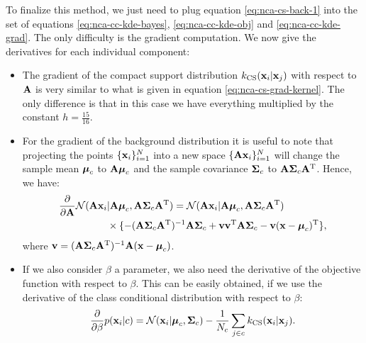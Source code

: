 	To finalize this method, we just need to plug equation \eqref{eq:nca-cs-back-1} into
	the set of equations \eqref{eq:nca-cc-kde-bayes}, \eqref{eq:nca-cc-kde-obj} and
	\eqref{eq:nca-cc-kde-grad}. The only difficulty is the gradient computation. We now give the derivatives for each individual component:
	\begin{itemize}
		\item The gradient of the compact support distribution $k_\text{CS}(\mathbf{x}_i|\mathbf{x}_j)$ with respect to $\mathbf{A}$ is very similar to what is given in equation \eqref{eq:nca-cs-grad-kernel}. The only difference is that in this case we have everything multiplied by the constant $h=\frac{15}{16}$.
		\item For the gradient of the background distribution it is useful to note that projecting the points $\{\mathbf{x}_i\}_{i=1}^N$
	into a new space $\{\mathbf{A}\mathbf{x}_i\}_{i=1}^N$ will change the sample mean $\mbox{\boldmath $\mu$}_c$ to
	$\mathbf{A}\mbox{\boldmath $\mu$}_c$ and the sample covariance $\mbox{\boldmath $\Sigma$}_c$ to
	$\mathbf{A}\mbox{\boldmath $\Sigma$}_c\mathbf{A}^\mathrm{T}$. Hence, we have:
		\begin{align}
			\frac{\partial}{\partial \mathbf{A}} \mathcal{N}(\mathbf{A}\mathbf{x}_i&|\mathbf{A}\mbox{\boldmath $\mu$}_c, \mathbf{A}\mbox{\boldmath $\Sigma$}_c
	\mathbf{A}^\mathrm{T}) = \mathcal{N}(\mathbf{A}\mathbf{x}_i|\mathbf{A}\mbox{\boldmath $\mu$}_c, \mathbf{A}\mbox{\boldmath $\Sigma$}_c
	\mathbf{A}^\mathrm{T})\notag\\
			&\times \{ -(\mathbf{A}\mbox{\boldmath $\Sigma$}_c \mathbf{A}^\mathrm{T})^{-1}\mathbf{A}\mbox{\boldmath $\Sigma$}_c
			+\mathbf{v} \mathbf{v} ^ \mathrm{T} \mathbf{A} \mbox{\boldmath $\Sigma$}_c - \mathbf{v} (\mathbf{x} - \mbox{\boldmath $\mu$}_c)^\mathrm{T}
			\},
		\end{align}
		where $\mathbf{v} = (\mathbf{A}\mbox{\boldmath $\Sigma$}_c \mathbf{A}^\mathrm{T})^{-1}\mathbf{A}(\mathbf{x} - \mbox{\boldmath $\mu$}_c)$.
		\item If we also consider $\beta$ a parameter, we also need the derivative of the objective function with respect to $\beta$. This can be easily obtained, if we use the derivative of the class conditional distribution with respect to $\beta$:
		\begin{align}
			\frac{\partial}{\partial\beta} p(\mathbf{x}_i|c) 
			=  \mathcal{N}(\mathbf{x}_i|\mbox{\boldmath $\mu$}_c,\mbox{\boldmath $\Sigma$}_c) -
				\frac{1}{N_c}\sum_{j\in c} k_\text{CS}(\mathbf{x}_i|\mathbf{x}_j).
		\end{align}
	\end{itemize}
	

